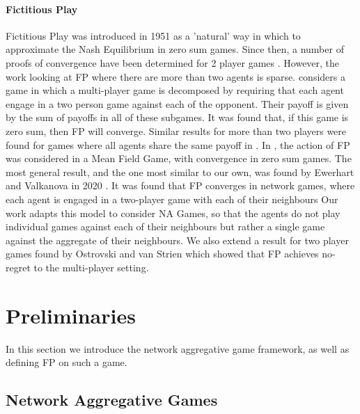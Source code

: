 \documentclass{article}
\theoremstyle{definition}
\begin{document}
\paragraph{Fictitious Play}

Fictitious Play was introduced in 1951 \cite{Brown1949} as a 'natural'
way in which to approximate the Nash Equilibrium in zero sum games. Since then, a number of proofs of convergence have been determined for 2 player games \cite{Robinson1951, Miyasawa1961, Metrick1994,Berger2007, Monderer1997, Monderer1996}. However, the work looking
at FP where there are more than two agents is sparse. \cite{Sela1999}
considers a game in which a multi-player game is decomposed by
requiring that each agent engage in a two person game against each of
the opponent. Their payoff is given by the sum of payoffs in all of
these subgames. It was found that, if this game is zero sum, then FP
will converge. Similar results for more than two players were found
for games where all agents share the same payoff in
\cite{Monderer1996}. In \cite{Perrin2020}, the action of FP was
considered in a Mean Field Game, with convergence in zero sum
games. The most general result, and the one most similar to our own,
was found by Ewerhart and Valkanova in 2020 \cite{Ewerhart2020}. It was found that FP converges in network games, where each
agent is engaged in a two-player game with each of their neighbours
Our work adapts this model to consider NA Games, so that the agents do not play
individual games against each of their neighbours but rather a single
game against the aggregate of their neighbours. We also
extend a result for two player games found by Ostrovski and van Strien
\cite{Ostrovski2014} which showed that FP achieves no-regret to the
multi-player setting.

\section{Preliminaries}
In this section we introduce the network aggregative game framework,
as well as defining FP on such a game.

\subsection{Network Aggregative Games}
\label{sec::NAG}
\end{document}
